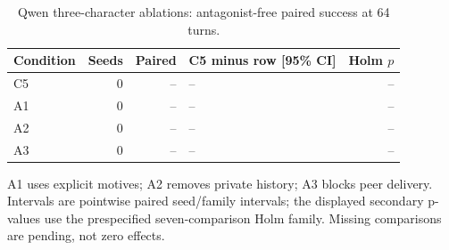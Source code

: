 \begin{table}[ht]\centering\small
\caption{Qwen three-character ablations: antagonist-free paired success at 64 turns.}
\begin{tabular}{lrrlr}\toprule
Condition & Seeds & Paired & C5 minus row [95\% CI] & Holm $p$\\\midrule
C5 & 0 & -- & -- & --\\
A1 & 0 & -- & -- & --\\
A2 & 0 & -- & -- & --\\
A3 & 0 & -- & -- & --\\
\bottomrule\end{tabular}\end{table}
A1 uses explicit motives; A2 removes private history; A3 blocks peer delivery. Intervals are pointwise paired seed/family intervals; the displayed secondary p-values use the prespecified seven-comparison Holm family. Missing comparisons are pending, not zero effects.

